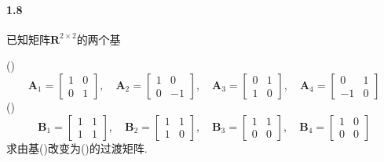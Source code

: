 \documentclass[12pt, a4paper, oneside, fontset=none]{ctexart}
\begin{document}
\paragraph*{1.8} 已知矩阵$\mathbf{R}^{2\times 2} $的两个基 \par
(\uppercase\expandafter{})
\[
    \bm{A}_1 = \begin{bmatrix}
        1 & 0 \\
        0 & 1
    \end{bmatrix}, \quad \bm{A}_2 = \begin{bmatrix}
        1 & 0  \\
        0 & -1
    \end{bmatrix}, \quad \bm{A}_3 = \begin{bmatrix}
        0 & 1 \\
        1 & 0
    \end{bmatrix}, \quad \bm{A}_4 = \begin{bmatrix}
        0  & 1 \\
        -1 & 0
    \end{bmatrix}
\]
(\uppercase\expandafter{})
\[
    \bm{B}_1 = \begin{bmatrix}
        1 & 1 \\
        1 & 1
    \end{bmatrix}, \quad \bm{B}_2 = \begin{bmatrix}
        1 & 1 \\
        1 & 0
    \end{bmatrix}, \quad \bm{B}_3 = \begin{bmatrix}
        1 & 1 \\
        0 & 0
    \end{bmatrix}, \quad \bm{B}_4 = \begin{bmatrix}
        1 & 0 \\
        0 & 0
    \end{bmatrix}
\]
求由基(\uppercase\expandafter{})改变为(\uppercase\expandafter{})的过渡矩阵.
\end{document}
